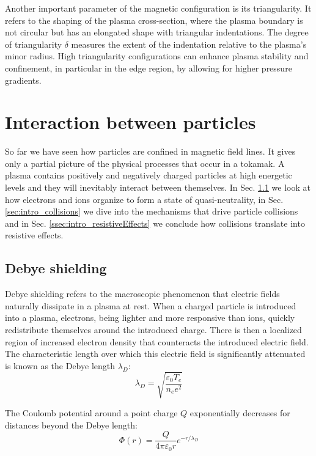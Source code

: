 Another important parameter of the magnetic configuration is its triangularity. It refers to the shaping of the plasma cross-section, where the plasma boundary is not circular but has an elongated shape with triangular indentations. The degree of triangularity $\delta$ measures the extent of the indentation relative to the plasma’s minor radius. High triangularity configurations can enhance plasma stability and confinement, in particular in the edge region, by allowing for higher pressure gradients.



\section{Interaction between particles}
\label{sec:intro_particlesInteration}
So far we have seen how particles are confined in magnetic field lines. It gives only a partial picture of the physical processes that occur in a tokamak. A plasma contains positively and negatively charged particles at high energetic levels and they will inevitably interact between themselves. In Sec. \ref{ssec:intro_DebyeShielding} we look at how electrons and ions organize to form a state of quasi-neutrality, in Sec. \ref{sec:intro_collisions} we dive into the mechanisms that drive particle collisions and in Sec. \ref{ssec:intro_resistiveEffects} we conclude how collisions translate into resistive effects.

\subsection{Debye shielding}
\label{ssec:intro_DebyeShielding}
Debye shielding refers to the macroscopic phenomenon that electric fields naturally dissipate in a plasma at rest. When a charged particle is introduced into a plasma, electrons, being lighter and more responsive than ions, quickly redistribute themselves around the introduced charge. There is then a localized region of increased electron density that counteracts the introduced electric field. The characteristic length over which this electric field is significantly attenuated is known as the Debye length $\lambda_D$:
\begin{equation}
	\label{eq:1_DebyeLength}
	\lambda_D = \sqrt{\frac{\varepsilon_0T_e}{n_ee^2}}
\end{equation}

The Coulomb potential around a point charge $Q$ exponentially decreases for distances beyond the Debye length:
\begin{equation}
	\label{eq:1_CoulombPotential}
	\Phi(r) = \frac{Q}{4\pi\varepsilon_0r}e^{-r/\lambda_D}
\end{equation}

